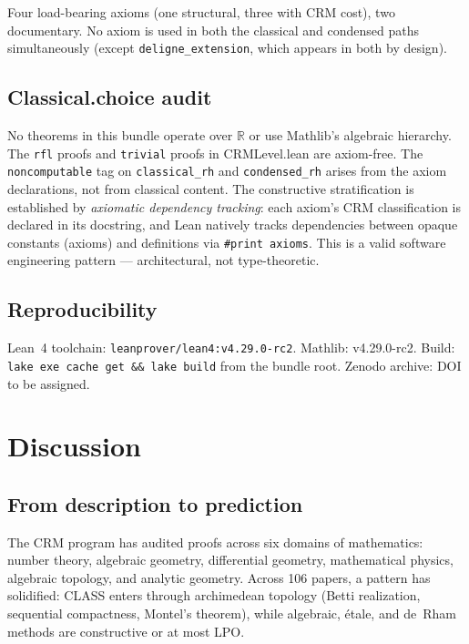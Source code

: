 \documentclass[11pt,a4paper]{article}
\theoremstyle{plain}
\theoremstyle{definition}
\newcommand{\LPO}{\textsf{LPO}}
\newcommand{\CLASS}{\textsf{CLASS}}
\newcommand{\R}{\mathbb{R}}
\begin{document}
Four load-bearing axioms (one structural, three with CRM cost), two documentary.
No axiom is used in both the classical and condensed paths simultaneously (except \texttt{deligne\_extension}, which appears in both by design).

\subsection{Classical.choice audit}

No theorems in this bundle operate over $\R$ or use Mathlib's algebraic hierarchy.
The \texttt{rfl} proofs and \texttt{trivial} proofs in CRMLevel.lean are axiom-free.
The \texttt{noncomputable} tag on \texttt{classical\_rh} and \texttt{condensed\_rh} arises from the axiom declarations, not from classical content.
The constructive stratification is established by \emph{axiomatic dependency tracking}: each axiom's CRM classification is declared in its docstring, and Lean natively tracks dependencies between opaque constants (axioms) and definitions via \texttt{\#print axioms}.
This is a valid software engineering pattern --- architectural, not type-theoretic.

\subsection{Reproducibility}

Lean~4 toolchain: \texttt{leanprover/lean4:v4.29.0-rc2}.
Mathlib: v4.29.0-rc2.
Build: \texttt{lake exe cache get \&\& lake build} from the bundle root.
Zenodo archive: DOI to be assigned.

\section{Discussion}
\label{sec:discussion}

\subsection{From description to prediction}

The CRM program has audited proofs across six domains of mathematics: number theory, algebraic geometry, differential geometry, mathematical physics, algebraic topology, and analytic geometry.
Across 106 papers, a pattern has solidified: \CLASS{} enters through archimedean topology (Betti realization, sequential compactness, Montel's theorem), while algebraic, étale, and de~Rham methods are constructive or at most \LPO.
\end{document}
